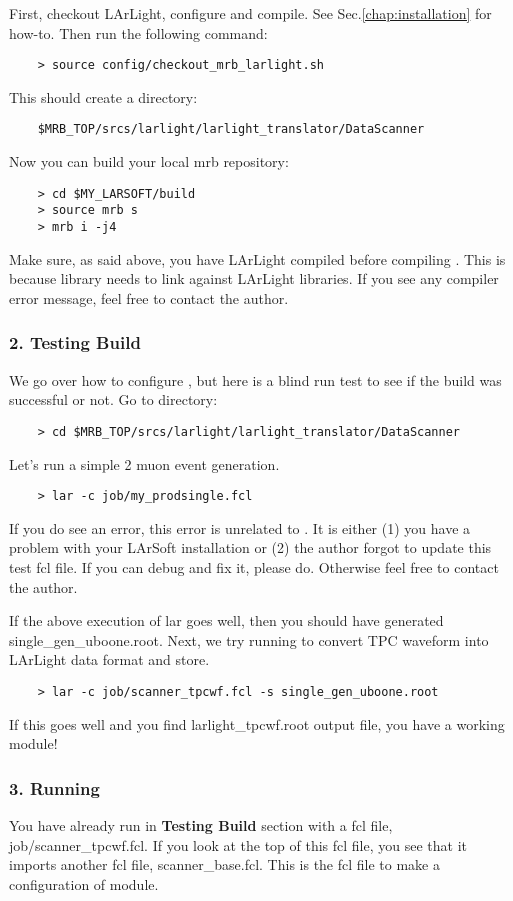 First, checkout LArLight, configure and compile. See Sec.\ref{chap:installation} for how-to. Then run the following command:
\begin{lstlisting}
    > source config/checkout_mrb_larlight.sh
\end{lstlisting}
This should create a directory:
\begin{lstlisting}
    $MRB_TOP/srcs/larlight/larlight_translator/DataScanner
\end{lstlisting}
Now you can build your local {\ttfamily mrb} repository:
\begin{lstlisting}
    > cd $MY_LARSOFT/build
    > source mrb s
    > mrb i -j4
\end{lstlisting}
Make sure, as said above, you have LArLight compiled before compiling \DataScanner. 
This is because \DataScanner library needs to link against LArLight libraries. 
If you see any compiler error message, feel free to contact the author.

\subsubsection{2. Testing \DataScanner Build}
We go over how to configure \DataScanner, but here is a blind run test to see if the build was successful or not.
Go to \DataScanner directory:
\begin{lstlisting}
    > cd $MRB_TOP/srcs/larlight/larlight_translator/DataScanner
\end{lstlisting}
Let's run a simple 2 muon event generation.
\begin{lstlisting}
    > lar -c job/my_prodsingle.fcl
\end{lstlisting}
If you do see an error, this error is unrelated to \DataScanner.
It is either (1) you have a problem with your LArSoft installation or (2) the author forgot to update this test fcl file. If you can debug and fix it, please do. Otherwise feel free to contact the author.

If the above execution of {\ttfamily lar} goes well, then you should have generated {\ttfamily single\_gen\_uboone.root}. Next, we try running \DataScanner to convert TPC waveform into LArLight data format and store.
\begin{lstlisting}
    > lar -c job/scanner_tpcwf.fcl -s single_gen_uboone.root
\end{lstlisting}
If this goes well and you find {\ttfamily larlight\_tpcwf.root} output file, you have a working \DataScanner module!

\subsubsection{3. Running \DataScanner}
You have already run \DataScanner in {\bf Testing \DataScanner Build} section with a fcl file, {\ttfamily job/scanner\_tpcwf.fcl}. If you look at the top of this fcl file, you see that it imports another fcl file, {\ttfamily scanner\_base.fcl}. This is the fcl file to make a configuration of \DataScanner module. 

